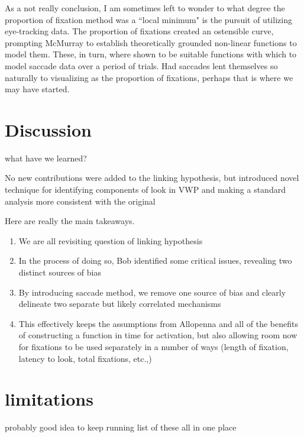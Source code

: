 \documentclass{article}
\begin{document}
As a not really conclusion, I am sometimes left to wonder to what degree the proportion of fixation method was a  ``local minimum" is the pursuit of utilizing eye-tracking data. The proportion of fixations created an ostensible curve, prompting McMurray to establish theoretically grounded non-linear functions to model them. These, in turn, where shown to be suitable functions with which to model saccade data over a period of trials. Had saccades lent themselves so naturally to visualizing as the proportion of fixations, perhaps that is where we may have started.

\section{Discussion}

what have we learned?

No new contributions were added to the linking hypothesis, but introduced novel technique for identifying components of look in VWP and making a standard analysis more consistent with the original

Here are really the main takeaways.

\begin{singlespace}
\begin{enumerate}
\vspace{-2mm}
\item We are all revisiting question of linking hypothesis
\item In the process of doing so, Bob identified some critical issues, revealing two distinct sources of bias
\item By introducing saccade method, we remove one source of bias and clearly delineate two separate but likely correlated mechanisms
\item This effectively keeps the assumptions from Allopenna and all of the benefits of constructing a function in time for activation, but also allowing room now for fixations to be used separately in a number of ways (length of fixation, latency to look, total fixations, etc.,)
\end{enumerate}
\end{singlespace}




\section{limitations}

probably good idea to keep running list of these all in one place
\end{document}

